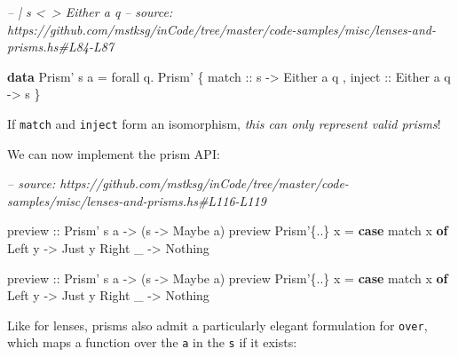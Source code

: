 \documentclass[]{article}
\newenvironment{Shaded}{}{}
\newcommand{\CommentTok}[1]{\textcolor[rgb]{0.38,0.63,0.69}{\textit{#1}}}
\newcommand{\DataTypeTok}[1]{\textcolor[rgb]{0.56,0.13,0.00}{#1}}
\newcommand{\FunctionTok}[1]{\textcolor[rgb]{0.02,0.16,0.49}{#1}}
\newcommand{\KeywordTok}[1]{\textcolor[rgb]{0.00,0.44,0.13}{\textbf{#1}}}
\newcommand{\NormalTok}[1]{#1}
\newcommand{\OtherTok}[1]{\textcolor[rgb]{0.00,0.44,0.13}{#1}}
\begin{document}
\begin{Shaded}
\begin{Highlighting}[]
\CommentTok{-- | s <~> Either a q}
\CommentTok{-- source: https://github.com/mstksg/inCode/tree/master/code-samples/misc/lenses-and-prisms.hs#L84-L87}

\KeywordTok{data} \DataTypeTok{Prism'}\NormalTok{ s a }\FunctionTok{=}\NormalTok{ forall q}\FunctionTok{.} \DataTypeTok{Prism'}
\NormalTok{    \{}\OtherTok{ match  ::}\NormalTok{ s }\OtherTok{->} \DataTypeTok{Either}\NormalTok{ a q}
\NormalTok{    ,}\OtherTok{ inject ::} \DataTypeTok{Either}\NormalTok{ a q }\OtherTok{->}\NormalTok{ s}
\NormalTok{    \}}
\end{Highlighting}
\end{Shaded}

If \texttt{match} and \texttt{inject} form an isomorphism, \emph{this can only
represent valid prisms}!

We can now implement the prism API:

\begin{Shaded}
\begin{Highlighting}[]
\CommentTok{-- source: https://github.com/mstksg/inCode/tree/master/code-samples/misc/lenses-and-prisms.hs#L116-L119}

\OtherTok{preview ::} \DataTypeTok{Prism'}\NormalTok{ s a }\OtherTok{->}\NormalTok{ (s }\OtherTok{->} \DataTypeTok{Maybe}\NormalTok{ a)}
\NormalTok{preview }\DataTypeTok{Prism'}\NormalTok{\{}\FunctionTok{..}\NormalTok{\} x }\FunctionTok{=} \KeywordTok{case}\NormalTok{ match x }\KeywordTok{of}
    \DataTypeTok{Left}\NormalTok{  y }\OtherTok{->} \DataTypeTok{Just}\NormalTok{ y}
    \DataTypeTok{Right}\NormalTok{ _ }\OtherTok{->} \DataTypeTok{Nothing}

\OtherTok{preview ::} \DataTypeTok{Prism'}\NormalTok{ s a }\OtherTok{->}\NormalTok{ (s }\OtherTok{->} \DataTypeTok{Maybe}\NormalTok{ a)}
\NormalTok{preview }\DataTypeTok{Prism'}\NormalTok{\{}\FunctionTok{..}\NormalTok{\} x }\FunctionTok{=} \KeywordTok{case}\NormalTok{ match x }\KeywordTok{of}
    \DataTypeTok{Left}\NormalTok{  y }\OtherTok{->} \DataTypeTok{Just}\NormalTok{ y}
    \DataTypeTok{Right}\NormalTok{ _ }\OtherTok{->} \DataTypeTok{Nothing}
\end{Highlighting}
\end{Shaded}

Like for lenses, prisms also admit a particularly elegant formulation for
\texttt{over}, which maps a function over the \texttt{a} in the \texttt{s} if it
exists:
\end{document}
